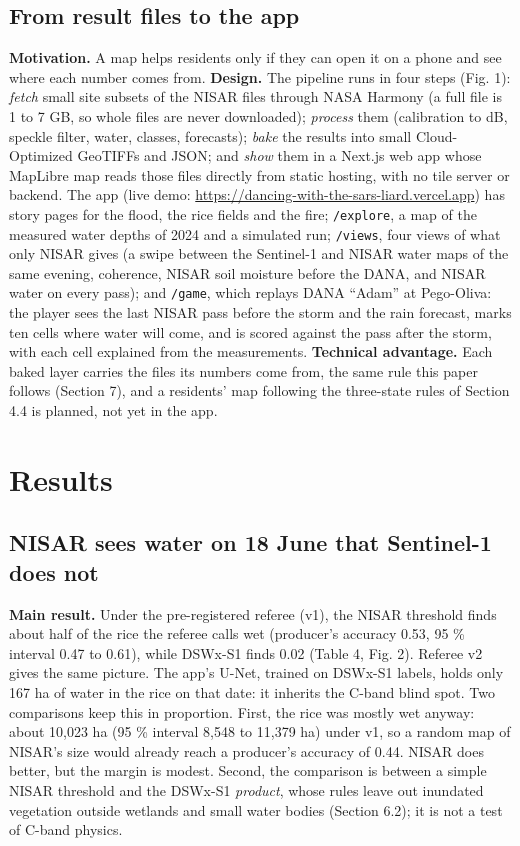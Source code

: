 \documentclass[10pt,twocolumn]{article}
\begin{document}
\subsection{From result files to the app}
\textbf{Motivation.} A map helps residents only if they can open it on a phone and see where each number comes from. \textbf{Design.} The pipeline runs in four steps (Fig. 1): \emph{fetch} small site subsets of the NISAR files through NASA Harmony (a full file is 1 to 7 GB, so whole files are never downloaded); \emph{process} them (calibration to dB, speckle filter, water, classes, forecasts); \emph{bake} the results into small Cloud-Optimized GeoTIFFs and JSON; and \emph{show} them in a Next.js web app whose MapLibre map reads those files directly from static hosting, with no tile server or backend. The app (live demo: \url{https://dancing-with-the-sars-liard.vercel.app}) has story pages for the flood, the rice fields and the fire; \texttt{/\allowbreak{}explore}, a map of the measured water depths of 2024 and a simulated run; \texttt{/\allowbreak{}views}, four views of what only NISAR gives (a swipe between the Sentinel-1 and NISAR water maps of the same evening, coherence, NISAR soil moisture before the DANA, and NISAR water on every pass); and \texttt{/\allowbreak{}game}, which replays DANA ``Adam'' at Pego-Oliva: the player sees the last NISAR pass before the storm and the rain forecast, marks ten cells where water will come, and is scored against the pass after the storm, with each cell explained from the measurements. \textbf{Technical advantage.} Each baked layer carries the files its numbers come from, the same rule this paper follows (Section 7), and a residents' map following the three-state rules of Section 4.4 is planned, not yet in the app.

\section{Results}
\subsection{NISAR sees water on 18 June that Sentinel-1 does not}
\textbf{Main result.} Under the pre-registered referee (v1), the NISAR threshold finds about half of the rice the referee calls wet (producer's accuracy 0.53, 95 \% interval 0.47 to 0.61), while DSWx-S1 finds 0.02 (Table 4, Fig. 2). Referee v2 gives the same picture. The app's U-Net, trained on DSWx-S1 labels, holds only 167 ha of water in the rice on that date: it inherits the C-band blind spot. Two comparisons keep this in proportion. First, the rice was mostly wet anyway: about 10,023 ha (95 \% interval 8,548 to 11,379 ha) under v1, so a random map of NISAR's size would already reach a producer's accuracy of 0.44. NISAR does better, but the margin is modest. Second, the comparison is between a simple NISAR threshold and the DSWx-S1 \emph{product}, whose rules leave out inundated vegetation outside wetlands and small water bodies (Section 6.2); it is not a test of C-band physics.
\end{document}
